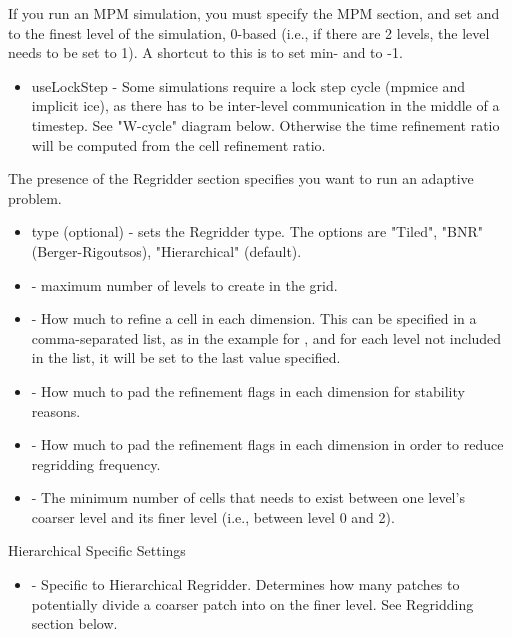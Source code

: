 If you run an MPM simulation, you must specify the MPM section, and
set  and  to the finest level of the
simulation, 0-based (i.e., if there are 2 levels, the level needs to
be set to 1). A shortcut to this is to set min- and  to
-1.

\begin{itemize}
\item useLockStep - Some simulations require a lock step cycle (mpmice
  and implicit ice), as there has to be inter-level communication in
  the middle of a timestep. See "W-cycle" diagram below. Otherwise the
  time refinement ratio will be computed from the cell refinement
  ratio.
\end{itemize}


The presence of the Regridder section specifies you want to run an
adaptive problem.
\begin{itemize}
  \item type (optional) - sets the Regridder type. The options are
   "Tiled", "BNR" (Berger-Rigoutsos), "Hierarchical" (default).
 \item {} - maximum number of levels to create in the grid. 
 \item {} - How much to refine a cell in each
   dimension. This can be specified in a comma-separated list, as in
   the example for , and for each level not
   included in the list, it will be set to the last value specified.
 \item {} - How much to pad the refinement flags
   in each dimension for stability reasons.
 \item {} - How much to pad the refinement flags in
   each dimension in order to reduce regridding frequency.
 \item {} - The minimum number of cells that needs to
   exist between one level's coarser level and its finer level (i.e.,
   between level 0 and 2).
\end{itemize}

Hierarchical Specific Settings

\begin{itemize}
\item {} - Specific to Hierarchical
  Regridder. Determines how many patches to potentially divide a
  coarser patch into on the finer level. See Regridding section below.
\end{itemize}

